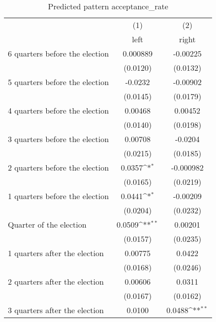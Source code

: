 \begin{table}[htbp]\centering
\def\sym#1{\ifmmode^{#1}\else\(^{#1}\)\fi}
\caption{Predicted pattern acceptance\_rate}
\begin{tabular}{l*{2}{c}}
\hline\hline
                    &\multicolumn{1}{c}{(1)}&\multicolumn{1}{c}{(2)}\\
                    &\multicolumn{1}{c}{left}&\multicolumn{1}{c}{right}\\
\hline
 6 quarters before the election&    0.000889         &    -0.00225         \\
                    &    (0.0120)         &    (0.0132)         \\
[1em]
 5 quarters before the election&     -0.0232         &    -0.00902         \\
                    &    (0.0145)         &    (0.0179)         \\
[1em]
 4 quarters before the election&     0.00468         &     0.00452         \\
                    &    (0.0140)         &    (0.0198)         \\
[1em]
 3 quarters before the election&     0.00708         &     -0.0204         \\
                    &    (0.0215)         &    (0.0185)         \\
[1em]
 2 quarters before the election&      0.0357\sym{*}  &   -0.000982         \\
                    &    (0.0165)         &    (0.0219)         \\
[1em]
 1 quarters before the election&      0.0441\sym{*}  &    -0.00209         \\
                    &    (0.0204)         &    (0.0232)         \\
[1em]
Quarter of the election&      0.0509\sym{**} &     0.00201         \\
                    &    (0.0157)         &    (0.0235)         \\
[1em]
 1 quarters after the election&     0.00775         &      0.0422         \\
                    &    (0.0168)         &    (0.0246)         \\
[1em]
 2 quarters after the election&     0.00606         &      0.0311         \\
                    &    (0.0167)         &    (0.0162)         \\
[1em]
 3 quarters after the election&      0.0100         &      0.0488\sym{**} \\

\end{tabular}
\end{table}
